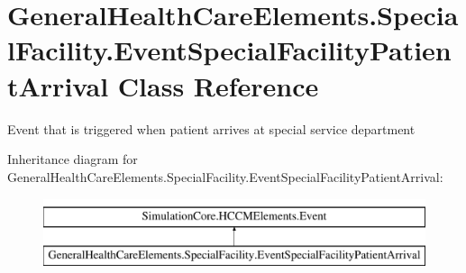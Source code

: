 \hypertarget{class_general_health_care_elements_1_1_special_facility_1_1_event_special_facility_patient_arrival}{}\section{General\+Health\+Care\+Elements.\+Special\+Facility.\+Event\+Special\+Facility\+Patient\+Arrival Class Reference}
\label{class_general_health_care_elements_1_1_special_facility_1_1_event_special_facility_patient_arrival}


Event that is triggered when patient arrives at special service department  


Inheritance diagram for General\+Health\+Care\+Elements.\+Special\+Facility.\+Event\+Special\+Facility\+Patient\+Arrival\+:\begin{figure}[H]
\begin{center}
\leavevmode
\includegraphics[height=2.000000cm]{class_general_health_care_elements_1_1_special_facility_1_1_event_special_facility_patient_arrival}
\end{center}
\end{figure}
